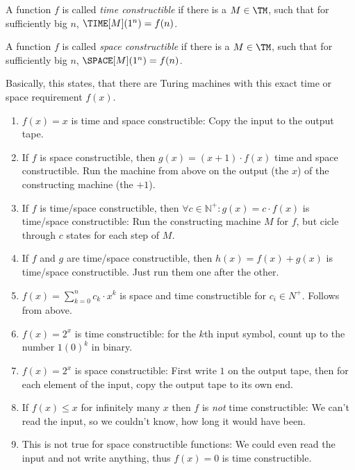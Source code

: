 \begin{defn}
	A function $f$ is called {\em time constructible}\/ if there is a 
	$M\in\TM$, such that for sufficiently big $n$, $\TIME[M](1^n) = f(n)$.

	A function $f$ is called {\em space constructible}\/ if there is a $M\in\TM$, 
	such that for sufficiently big $n$, $\SPACE[M](1^n)=f(n)$.

	Basically, this states, that there are Turing machines with this exact time 
	or space requirement $f(x)$.
\end{defn}
\begin{example}
	\begin{enumerate}
		\item $f(x)=x$ is time and space 
			constructible: Copy the input to the output tape.
		\item If $f$ is space constructible, then $g(x)=(x+1)\cdot f(x)$ time and space
			constructible. Run the machine from above on the output (the $x$) of the
			constructing machine (the $+1$).
		\item If $f$ is time/space constructible, then 
			$\forall c\in \mathbb{N^+}: g(x)=c\cdot f(x)$ is time/space 
			constructible: Run the constructing machine $M$ for $f$, but cicle through $c$ 
			states for each step of $M$.
		\item If $f$ and $g$ are time/space constructible, then $h(x) = f(x)+g(x)$ is time/space
			constructible. Just run them one after the other. 
		\item $f(x)=\sum^n_{k=0}c_k\cdot x^k$ is space and time constructible for 
			$c_i\in N^+$. Follows from above.
		\item $f(x)=2^x$ is time constructible: for the $k$th input symbol, count up 
			to the number $1(0)^k$ in binary.
		\item $f(x)=2^x$ is space constructible: First write $1$ on the output 
			tape, then for each element of the input, copy the output tape to its own end.
		\item If $f(x)\leq x$ for infinitely many $x$ then $f$ is {\em not}\/ time
			constructible: We can't read the input, so we couldn't know, how long it
			would have been.
		\item This is not true for space constructible functions: We could even 
			read the input and not write anything, thus $f(x)=0$ is time constructible.
	\end{enumerate}
\end{example}

